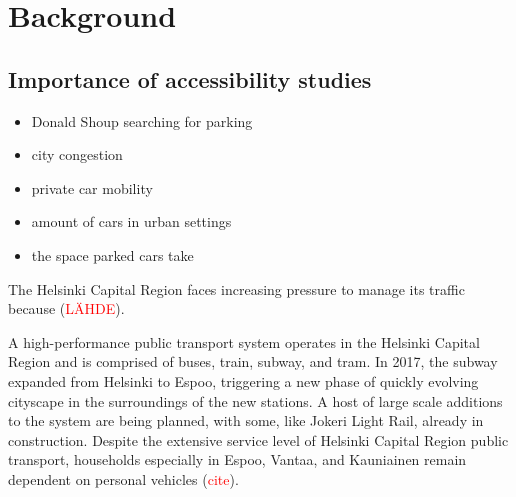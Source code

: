 \section{Background}
\subsection{Importance of accessibility studies}
\justify



\begin{itemize}
    \item Donald Shoup searching for parking
    \item city congestion
    \item private car mobility
    \item amount of cars in urban settings
    \item the space parked cars take
\end{itemize}

The Helsinki Capital Region faces increasing pressure to manage its traffic because (\textcolor{red}{LÄHDE}).

A high-performance public transport system operates in the Helsinki Capital Region and is comprised of buses, train, subway, and tram. In 2017, the subway expanded from Helsinki to Espoo, triggering a new phase of quickly evolving cityscape in the surroundings of the new stations. A host of large scale additions to the system are being planned, with some, like Jokeri Light Rail, already in construction. Despite the extensive service level of Helsinki Capital Region public transport, households especially in Espoo, Vantaa, and Kauniainen remain dependent on personal vehicles (\textcolor{red}{cite}).

